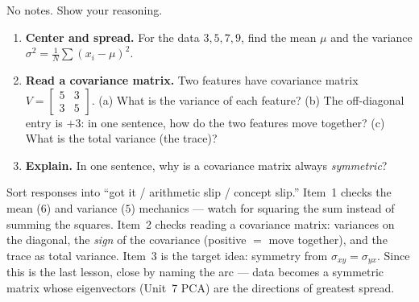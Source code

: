 \documentclass[10pt]{article}
\begin{document}
\namedateperiod

\vspace{0.15in}

No notes. Show your reasoning.

\begin{enumerate}[leftmargin=1.8em, itemsep=16pt]
  \item \textbf{Center and spread.} For the data $3,5,7,9$, find the mean $\mu$ and the variance
        $\sigma^2=\frac1N\sum(x_i-\mu)^2$.
  \item \textbf{Read a covariance matrix.} Two features have covariance matrix
        $V=\left[\begin{smallmatrix}5&3\\3&5\end{smallmatrix}\right]$.
        (a) What is the variance of each feature? \; (b) The off-diagonal entry is $+3$: in one sentence, how do
        the two features move together? \; (c) What is the total variance (the trace)?
  \item \textbf{Explain.} In one sentence, why is a covariance matrix always \emph{symmetric}?
\end{enumerate}

\begin{teachernote}
Sort responses into ``got it / arithmetic slip / concept slip.'' Item~1 checks the mean ($6$) and variance
($5$) mechanics --- watch for squaring the sum instead of summing the squares. Item~2 checks reading a covariance
matrix: variances on the diagonal, the \emph{sign} of the covariance (positive $=$ move together), and the trace
as total variance. Item~3 is the target idea: symmetry from $\sigma_{xy}=\sigma_{yx}$. Since this is the last
lesson, close by naming the arc --- data becomes a symmetric matrix whose eigenvectors (Unit~7 PCA) are the
directions of greatest spread.
\end{teachernote}
\end{document}
